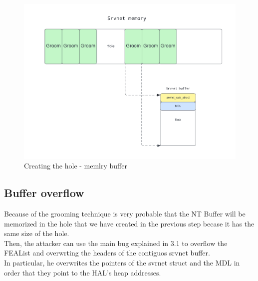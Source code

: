 \begin{figure}[ht!]
    \centering
      \includegraphics[scale=0.5]{images/exploit_4_buff.png}
      \caption{Creating the hole - memlry buffer}
\end{figure}

\clearpage
\subsection{Buffer overflow}
Because of the grooming technique is very probable that the NT Buffer will be memorized in 
the hole that we have created in the previous step becase it has the same size of the hole.\\
Then, the attacker can use the main bug explained in 3.1 to overflow the FEAList and overwrting the headers of the contiguos srvnet buffer.\\
In particular, he overwrites the pointers of the svrnet struct and the MDL in order that they point to the HAL's heap addresses.

